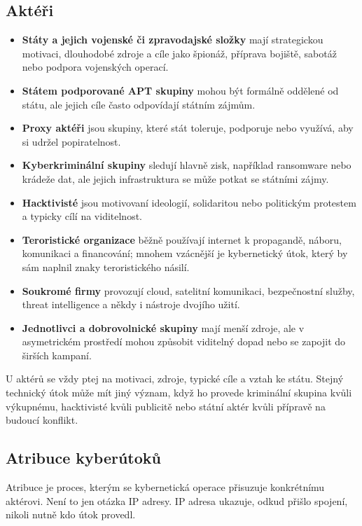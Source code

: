 \subsection*{Aktéři}
\begin{itemize}
  \item \textbf{Státy a jejich vojenské či zpravodajské složky} mají strategickou motivaci, dlouhodobé zdroje a cíle jako špionáž, příprava bojiště, sabotáž nebo podpora vojenských operací.
  \item \textbf{Státem podporované APT skupiny} mohou být formálně oddělené od státu, ale jejich cíle často odpovídají státním zájmům.
  \item \textbf{Proxy aktéři} jsou skupiny, které stát toleruje, podporuje nebo využívá, aby si udržel popiratelnost.
  \item \textbf{Kyberkriminální skupiny} sledují hlavně zisk, například ransomware nebo krádeže dat, ale jejich infrastruktura se může potkat se státními zájmy.
  \item \textbf{Hacktivisté} jsou motivovaní ideologií, solidaritou nebo politickým protestem a typicky cílí na viditelnost.
  \item \textbf{Teroristické organizace} běžně používají internet k propagandě, náboru, komunikaci a financování; mnohem vzácnější je kybernetický útok, který by sám naplnil znaky teroristického násilí.
  \item \textbf{Soukromé firmy} provozují cloud, satelitní komunikaci, bezpečnostní služby, threat intelligence a někdy i nástroje dvojího užití.
  \item \textbf{Jednotlivci a dobrovolnické skupiny} mají menší zdroje, ale v asymetrickém prostředí mohou způsobit viditelný dopad nebo se zapojit do širších kampaní.
\end{itemize}
U aktérů se vždy ptej na motivaci, zdroje, typické cíle a vztah ke státu. Stejný technický útok může mít jiný význam, když ho provede kriminální skupina kvůli výkupnému, hacktivisté kvůli publicitě nebo státní aktér kvůli přípravě na budoucí konflikt.

\subsection*{Atribuce kyberútoků}
Atribuce je proces, kterým se kybernetická operace přisuzuje konkrétnímu aktérovi. Není to jen otázka IP adresy. IP adresa ukazuje, odkud přišlo spojení, nikoli nutně kdo útok provedl.

